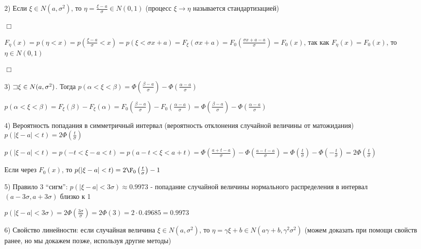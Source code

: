 \documentclass[12pt]{article}
\begin{document}
    2) Если $\xi \in N(a, \sigma^2)$, то $\eta = \frac{\xi - a}{\sigma} \in N(0, 1)$ (процесс $\xi \to \eta$ называется стандартизацией)

    \begin{MyProof}
        $\Box$
        
        $F_\eta(x) = p(\eta < x) = p\left(\frac{\xi - a}{\sigma} < x\right) = p(\xi < \sigma x + a) = F_\xi(\sigma x + a) = F_0\left(\frac{\sigma x + a - a}{\sigma}\right) = F_0(x)$, так как $F_\eta(x) = F_0(x)$, то $\eta \in N(0, 1)$
        
        $\Box$
    \end{MyProof}

    3) $\mathord{\sqsupset} \xi \in N(a, \sigma^2)$. Тогда $p(\alpha < \xi < \beta) = \Phi\left(\frac{\beta - a}{\sigma}\right) - \Phi\left(\frac{\alpha - a}{\sigma}\right)$

    \begin{MyProof}
        $p(\alpha < \xi < \beta) = F_\xi(\beta) - F_\xi(\alpha) = F_0\left(\frac{\beta - a}{\sigma}\right) - F_0\left(\frac{\alpha - a}{\sigma}\right) = \Phi\left(\frac{\beta - a}{\sigma}\right) - \Phi\left(\frac{\alpha - a}{\sigma}\right)$
    \end{MyProof}

    4) Вероятность попадания в симметричный интервал (вероятность отклонения случайной величины от матожидания) 
    $p(|\xi - a| < t) = 2\Phi\left(\frac{t}{\sigma}\right)$

    \begin{MyProof}
        $p(|\xi - a| < t) = p(-t < \xi - a < t) = p(a - t < \xi < a + t) = \Phi\left(\frac{a + t - a}{\sigma}\right) - \Phi\left(\frac{a - t - a}{\sigma}\right) = \Phi\left(\frac{t}{\sigma}\right) - \Phi\left(-\frac{t}{\sigma}\right) = 2\Phi\left(\frac{t}{\sigma}\right)$
    \end{MyProof}

    \Notas Если через $F_0(x)$, то $p(|\xi - a| < t) = 2\F_0\left(\frac{t}{\sigma}\right) - 1$

    5) Правило 3 \enquote{сигм}: $p(|\xi - a| < 3\sigma) \approx 0.9973$ - попадание случайной величины нормального распределения в интервал $(a - 3\sigma, a + 3\sigma)$ близко к 1

    \begin{MyProof}
        $p(|\xi - a| < 3\sigma) = 2\Phi\left(\frac{3\sigma}{\sigma}\right) = 2\Phi(3) = 2 \cdot 0.49685 = 0.9973$
    \end{MyProof}

    6) Свойство линейности: если случайная величина $\xi \in N(a, \sigma^2)$, то $\eta = \gamma \xi + b \in N(a \gamma + b, \gamma^2 \sigma^2)$ (можем доказать при помощи свойств ранее, но мы докажем позже, используя другие методы)
\end{document}
